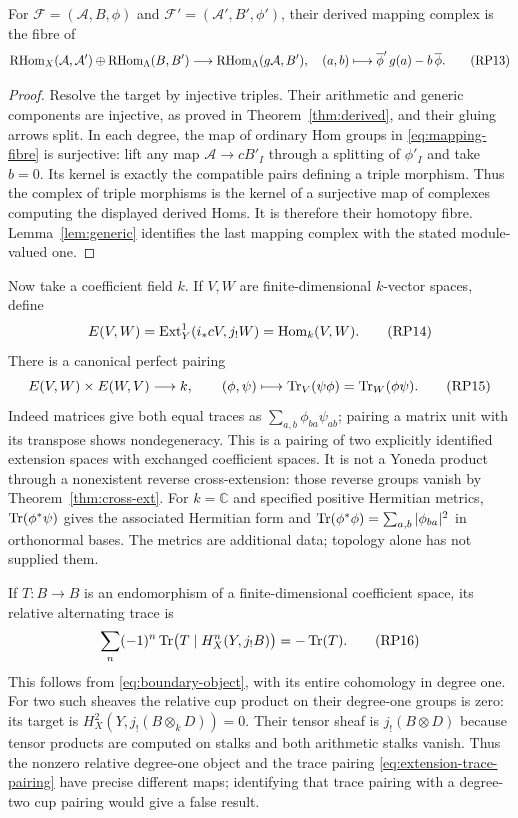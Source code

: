 \begin{proposition}\label{prop:mapping-complex}
For $\mathcal F=(\mathcal A,B,\phi)$ and
$\mathcal F'=(\mathcal A',B',\phi')$, their derived mapping complex is
the fibre of
\[
 \operatorname{RHom}_X(\mathcal A,\mathcal A')\oplus\operatorname{RHom}_\Lambda(B,B')
 \longrightarrow\operatorname{RHom}_\Lambda(g\mathcal A,B'),
 \quad (a,b)\longmapsto\overline\phi'\,g(a)-b\,\overline\phi.
 \tag{RP13}\label{eq:mapping-fibre}
\]
\end{proposition}
\begin{proof}
Resolve the target by injective triples. Their arithmetic and generic
components are injective, as proved in Theorem~\ref{thm:derived}, and
their gluing arrows split. In each degree, the map of ordinary Hom
groups in \eqref{eq:mapping-fibre} is surjective: lift any map
$\mathcal A\to cB'_I$ through a splitting of $\phi'_I$ and take $b=0$.
Its kernel is exactly the compatible pairs defining a triple morphism.
Thus the complex of triple morphisms is the kernel of a surjective
map of complexes computing the displayed derived Homs. It is therefore
their homotopy fibre. Lemma~\ref{lem:generic} identifies the last
mapping complex with the stated module-valued one.
\end{proof}

Now take a coefficient field $k$. If $V,W$ are finite-dimensional
$k$-vector spaces, define
\[
 E(V,W)=\operatorname{Ext}_Y^1(i_*cV,j_!W)=\operatorname{Hom}_k(V,W).
 \tag{RP14}\label{eq:extension-pairing-space}
\]
There is a canonical perfect pairing
\[
 E(V,W)\times E(W,V)\longrightarrow k,
 \qquad (\phi,\psi)\longmapsto\operatorname{Tr}_V(\psi\phi)=\operatorname{Tr}_W(\phi\psi).
 \tag{RP15}\label{eq:extension-trace-pairing}
\]
Indeed matrices give both equal traces as
$\sum_{a,b}\phi_{ba}\psi_{ab}$; pairing a matrix unit with its transpose
shows nondegeneracy. This is a pairing of two explicitly identified
extension spaces with exchanged coefficient spaces. It is not a Yoneda
product through a nonexistent reverse cross-extension: those reverse
groups vanish by Theorem~\ref{thm:cross-ext}. For $k=\mathbb C$ and
specified positive Hermitian metrics, $\operatorname{Tr}(\phi^*\psi)$ gives the
associated Hermitian form and $\operatorname{Tr}(\phi^*\phi)=\sum_{a,b}|\phi_{ba}|^2$
in orthonormal bases. The metrics are additional data; topology alone
has not supplied them.

If $T:B\to B$ is an endomorphism of a finite-dimensional coefficient
space, its relative alternating trace is
\[
 \sum_n(-1)^n\operatorname{Tr}\bigl(T\mid H_X^n(Y,j_!B)\bigr)=-\operatorname{Tr}(T).
 \tag{RP16}\label{eq:relative-trace}
\]
This follows from \eqref{eq:boundary-object}, with its entire
cohomology in degree one. For two such sheaves the relative cup product
on their degree-one groups is zero: its target is
$H_X^2(Y,j_!(B\otimes_k D))=0$. Their tensor sheaf is $j_!(B\otimes D)$
because tensor products are computed on stalks and both arithmetic
stalks vanish. Thus the nonzero relative degree-one object and the
trace pairing \eqref{eq:extension-trace-pairing} have precise different
maps; identifying that trace pairing with a degree-two cup pairing
would give a false result.

